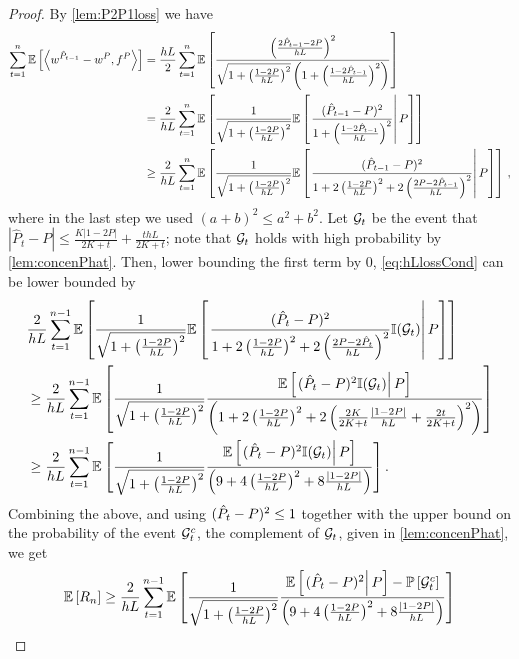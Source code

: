 \begin{proof}
	By \cref{lem:P2P1loss} we have
	\begin{align}
	\sum_{t=1}^n \mathbb{E}\left[ \left\langle w^{\hat{P}_{t-1}} - w^P, f^P\right\rangle \right] 
	& = \frac{hL}{2}\sum_{t=1}^n \mathbb{E}\left[  \frac{\left( \frac{2\hat{P}_{t-1} - 2P}{hL} \right)^2}{\sqrt{1+\left( \frac{1-2P}{hL}\right)^2 } \left(1+\left( \frac{1-2\hat{P}_{t-1}}{hL}\right)^2 \right)}  \right] \label{eq:hLloss} \\
	& = \frac{2}{hL}\sum_{t=1}^n \mathbb{E}\left[ \frac{1}{\sqrt{1+\left( \frac{1-2P}{hL}\right)^2 }}\mathbb{E}\left[ \left.  \frac{ ( \hat{P}_{t-1} - P)^2}{ 1+\left( \frac{1-2\hat P_{t-1}}{hL}\right)^2 }  \right| P \right]  \right] \nonumber \\
	& \ge \frac{2}{hL}\sum_{t=1}^n \mathbb{E}\left[  \frac{1}{\sqrt{1+\left( \frac{1-2P}{hL}\right)^2 }}\mathbb{E}\left[ \left.  \frac{( \hat{P}_{t-1} - P)^2}{ 1+ 2\left( \frac{1-2P}{hL}\right)^2 +2 \left(\frac{2P - 2\hat{P}_{t-1}}{hL}\right)^2 } \right| P  \right]  \right] \label{eq:hLlossCond}\,,
	\end{align}
	where in the last step we used $(a+b)^2 \le a^2 + b^2$. 	
	Let $\mathcal{G}_t$ be the event that $|\hat P_{t} - P| \le \frac{K |1-2P|}{2K+t} + \frac{t hL}{2K+t}$; note that $\mathcal{G}_t$ holds with high probability by \cref{lem:concenPhat}. Then, lower bounding the first term by $0$, \eqref{eq:hLlossCond} can be lower bounded by 
	\begin{align*}
	&\frac{2}{hL}\sum_{t=1}^{n-1} \mathbb{E}\left[  \frac{1}{\sqrt{1+\left( \frac{1-2P}{hL}\right)^2 }}\mathbb{E}\left[ \left.  \frac{( \hat{P}_{t} - P)^2}{ 1+ 2\left( \frac{1-2P}{hL}\right)^2 +2 \left(\frac{2P - 2\hat{P}_{t}}{hL}\right)^2 }\mathbb{I}(\mathcal{G}_t) \right| P  \right]  \right] \\
	&\ge \frac{2}{hL}\sum_{t=1}^{n-1} \mathbb{E}\left[  \frac{1}{\sqrt{1+\left( \frac{1-2P}{hL}\right)^2 }}\frac{\mathbb{E}\left[ \left.  ( \hat{P}_{t} - P )^2\mathbb{I}(\mathcal{G}_t)  \right| P \right]}{ \left(1+ 2\left( \frac{1-2P}{hL}\right)^2 +2 \left(\frac{2K}{2K+t}\frac{|1-2P|}{hL} + \frac{2t}{2K+t}\right)^2 \right)}   \right] \\
	& \ge \frac{2}{hL}\sum_{t=1}^{n-1} \mathbb{E}\left[ \frac{1}{\sqrt{1+\left( \frac{1-2P}{hL}\right)^2 }}\frac{\mathbb{E}\left[ \left.  ( \hat{P}_{t} - P )^2\mathbb{I}(\mathcal{G}_t)  \right| P \right]}{ \left(9+ 4\left( \frac{1-2P}{hL}\right)^2 +8 \frac{|1-2P|}{hL} \right)}   \right].
	\end{align*}
	Combining the above, and using $(\hat{P}_{t} - P )^2 \le 1$ together with the upper bound on the probability of the event $\mathcal{G}^c_t$, the complement of $\mathcal{G}_t$, given in \cref{lem:concenPhat}, we get
	\begin{align}
	\Exp{R_n} & \ge 
	\frac{2}{hL}\sum_{t=1}^{n-1} \Exp{\frac{1}{\sqrt{1+\left( \frac{1-2P}{hL}\right)^2 }}\frac{\Expc{ ( \hP_{t} - P )^2 }{P}-\Prob{\cG^c_t}}{ \left(9+ 4\left( \frac{1-2P}{hL}\right)^2 +8 \frac{|1-2P|}{hL} \right)}  } \nonumber \\

\end{align}
\end{proof}
